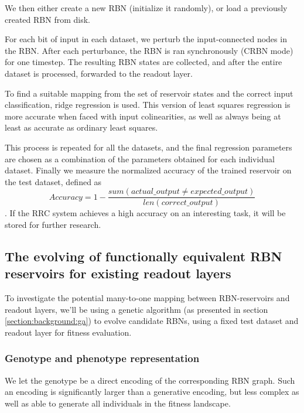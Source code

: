 We then either create a new RBN (initialize it randomly),
or load a previously created RBN from disk.

For each bit of input in each dataset,
we perturb the input-connected nodes in the RBN.
After each perturbance, the RBN is ran synchronously (CRBN mode) for one timestep.
The resulting RBN states are collected,
and after the entire dataset is processed,
forwarded to the readout layer.

To find a suitable mapping from the set of reservoir states and the correct input classification,
ridge regression \cite{hoerl1970ridge} is used.
This version of least squares regression is more accurate when faced with input colinearities,
as well as always being at least as accurate as ordinary least squares.

This process is repeated for all the datasets,
and the final regression parameters are chosen as a combination of the parameters obtained for each individual dataset.
Finally we measure the normalized accuracy of the trained reservoir on the test dataset,
defined as
\begin{equation}
Accuracy = 1 - \dfrac{sum(actual\_output \neq expected\_output)}{len(correct\_output)}
\label{formula:accuracy}
\end{equation}
.
If the RRC system achieves a high accuracy on an interesting task,
it will be stored for further research.

\subsection{The evolving of functionally equivalent RBN reservoirs for existing readout layers}
\label{section:method:evolving-rbns}

To investigate the potential many-to-one mapping between RBN-reservoirs and readout layers,
we'll be using a genetic algorithm (as presented in section \ref{section:background:ga}) to evolve candidate RBNs,
using a fixed test dataset and readout layer for fitness evaluation.

\subsubsection{Genotype and phenotype representation}

We let the genotype be a direct encoding of the corresponding RBN graph.
Such an encoding is significantly larger than a generative encoding,
but less complex as well as able to generate all individuals in the fitness landscape.

